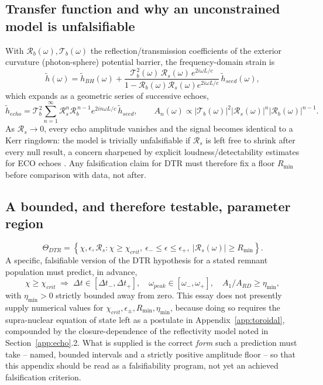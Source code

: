 \documentclass[11pt]{article}
\begin{document}
\subsection{Transfer function and why an unconstrained model is unfalsifiable}

With $\mathcal{R}_b(\omega),\mathcal{T}_b(\omega)$ the reflection/transmission coefficients of the exterior curvature (photon-sphere) potential barrier, the frequency-domain strain is \cite{cardosoetal2016echoes,marketal2017}
\begin{equation}
\tilde h(\omega) = \tilde h_{BH}(\omega) + \frac{\mathcal{T}_b^2(\omega)\,\mathcal{R}_s(\omega)\,e^{2i\omega L/c}}{1-\mathcal{R}_b(\omega)\mathcal{R}_s(\omega)e^{2i\omega L/c}}\,\tilde h_{seed}(\omega),
\end{equation}
which expands as a geometric series of successive echoes,
\begin{equation}
\tilde h_{echo} = \mathcal{T}_b^2\sum_{n=1}^\infty \mathcal{R}_s^n \mathcal{R}_b^{\,n-1} e^{2in\omega L/c}\,\tilde h_{seed}, \qquad A_n(\omega)\propto |\mathcal{T}_b(\omega)|^2|\mathcal{R}_s(\omega)|^n|\mathcal{R}_b(\omega)|^{n-1}.
\end{equation}
As $\mathcal{R}_s\to0$, every echo amplitude vanishes and the signal becomes identical to a Kerr ringdown: the model is trivially unfalsifiable if $\mathcal{R}_s$ is left free to shrink after every null result, a concern sharpened by explicit loudness/detectability estimates for ECO echoes \cite{maggioetal2019,micchietal2021}. Any falsification claim for DTR must therefore fix a floor $R_{\min}$ before comparison with data, not after.

\subsection{A bounded, and therefore testable, parameter region}

\begin{equation}
\Theta_{DTR} = \left\{\chi,\epsilon,\mathcal{R}_s : \chi\geq\chi_{crit},\ \epsilon_-\leq\epsilon\leq\epsilon_+,\ |\mathcal{R}_s(\omega)|\geq R_{\min}\right\}.
\end{equation}
A specific, falsifiable version of the DTR hypothesis for a stated remnant population must predict, in advance,
\begin{equation}
\chi\geq\chi_{crit} \;\Longrightarrow\; \Delta t\in[\Delta t_-,\Delta t_+], \quad \omega_{peak}\in[\omega_-,\omega_+], \quad A_1/A_{RD}\geq \eta_{\min},
\end{equation}
with $\eta_{\min}>0$ strictly bounded away from zero. This essay does not presently supply numerical values for $\chi_{crit},\epsilon_\pm,R_{\min},\eta_{\min}$, because doing so requires the supra-nuclear equation of state left as a postulate in Appendix~\ref{app:toroidal}, compounded by the closure-dependence of the reflectivity model noted in Section~\ref{app:echo}.2. What is supplied is the correct \emph{form} such a prediction must take -- named, bounded intervals and a strictly positive amplitude floor -- so that this appendix should be read as a falsifiability program, not yet an achieved falsification criterion.
\end{document}
